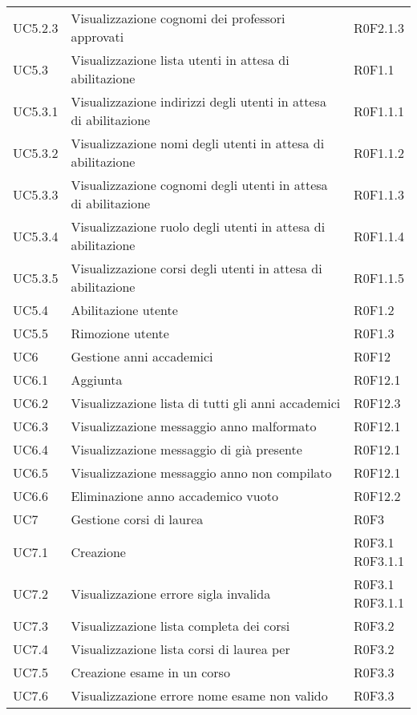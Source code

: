 \documentclass[AnalisiDeiRequisiti.tex]{subfiles}
\begin{document}
\begin{longtable}[H]{p{2cm}p{5cm}p{5cm}}
	UC5.2.3 & Visualizzazione cognomi dei professori approvati & R0F2.1.3 \\
	UC5.3 & Visualizzazione lista utenti in attesa di abilitazione & R0F1.1 \\
	UC5.3.1 & Visualizzazione indirizzi degli utenti in attesa di abilitazione & R0F1.1.1 \\
	UC5.3.2 & Visualizzazione nomi degli utenti in attesa di abilitazione & R0F1.1.2 \\
	UC5.3.3 & Visualizzazione cognomi degli utenti in attesa di abilitazione & R0F1.1.3 \\
	UC5.3.4 & Visualizzazione ruolo degli utenti in attesa di abilitazione &R0F1.1.4  \\
	UC5.3.5 & Visualizzazione corsi degli utenti in attesa di abilitazione & R0F1.1.5 \\
	UC5.4 & Abilitazione utente & R0F1.2 \\
	UC5.5 & Rimozione utente & R0F1.3 \\
	UC6 & Gestione anni accademici & R0F12 \\
	UC6.1 & Aggiunta \citGloss{anno accademico} & R0F12.1 \\
	UC6.2 & Visualizzazione lista di tutti gli anni accademici & R0F12.3 \\
	UC6.3 & Visualizzazione messaggio anno malformato & R0F12.1 \\
	UC6.4 & Visualizzazione messaggio di \citGloss{anno accademico} già presente & R0F12.1 \\
	UC6.5 & Visualizzazione messaggio anno non compilato & R0F12.1 \\
	UC6.6 & Eliminazione anno accademico vuoto & R0F12.2 \\
	UC7 & Gestione corsi di laurea & R0F3 \\
	UC7.1 & Creazione \citGloss{corso di laurea} & \makecell[tl]{
		R0F3.1\\
		R0F3.1.1 } \\
	UC7.2 & Visualizzazione errore sigla invalida & \makecell[tl]{
		R0F3.1\\
		R0F3.1.1 } \\
	UC7.3 & Visualizzazione lista completa dei corsi & R0F3.2 \\
	UC7.4 & Visualizzazione lista corsi di laurea per \citGloss{anno accademico} & R0F3.2  \\
	UC7.5 & Creazione esame in un corso & R0F3.3\\
	UC7.6 & Visualizzazione errore nome esame non valido & R0F3.3  \\

\end{longtable}
\end{document}
